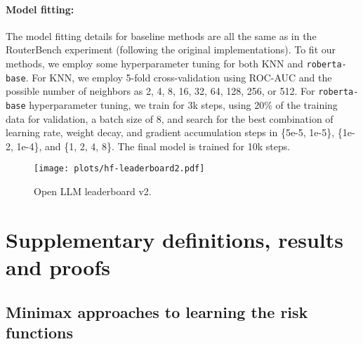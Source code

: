 \paragraph{Model fitting:} The model fitting details for baseline methods are all the same as in the RouterBench experiment (following the original implementations). To fit our methods, we employ some hyperparameter tuning for both KNN and \texttt{roberta-base}. For KNN, we employ 5-fold cross-validation using ROC-AUC and the possible number of neighbors as 2, 4, 8, 16, 32, 64, 128, 256, or 512. For \texttt{roberta-base} hyperparameter tuning, we train for 3k steps, using 20\% of the training data for validation, a batch size of 8, and search for the best combination of learning rate, weight decay, and gradient accumulation steps in \{5e-5, 1e-5\}, \{1e-2, 1e-4\}, and \{1, 2, 4, 8\}. The final model is trained for 10k steps.


\begin{figure}[H]
    \centering
    \texttt{[image: plots/hf-leaderboard2.pdf]}
    \caption{Open LLM leaderboard v2.}
    \label{fig:rexp_open_llm2}
\end{figure}



\section{Supplementary definitions, results and proofs}
\label{sec:proofs}


\subsection{Minimax approaches to learning the risk functions}
\label{sec:reg-fn-estimate}

